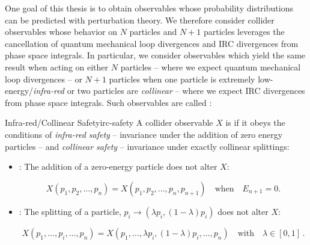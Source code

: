 One goal of this thesis is to obtain observables whose probability distributions can be predicted with perturbation theory.
%
We therefore consider collider observables whose behavior on \(N\) particles and \(N+1\) particles leverages the cancellation of quantum mechanical loop divergences and IRC divergences from phase space integrals.
%
In particular, we consider observables which yield the same result when acting on either \(N\) particles -- where we expect quantum mechanical loop divergences -- or \(N+1\) particles when one particle is extremely low-energy/\emph{infra-red} or two particles are \emph{collinear} -- where we expect IRC divergences from phase space integrals.
%
Such observables are called :


\begin{definitionbox}{Infra-red/Collinear Safety}{irc-safety}
    A collider observable \( X \) is  if it obeys the conditions of \emph{infra-red safety} -- invariance under the addition of zero energy particles -- and \emph{collinear safety} -- invariance under exactly collinear splittings:
    \begin{itemize}
        \item
            :
            The addition of a zero-energy particle does not alter \( X \):

        \begin{equation}
            X(p_1, p_2, \dots, p_n)
            =
            X(p_1, p_2, \dots, p_n, p_{n+1})
            \quad
            \text{when}
            \quad E_{n+1} = 0.
        \end{equation}


        \item
            :
            The  splitting of a particle, \(p_i \to (\lambda p_i, (1-\lambda) p_i)\) does not alter \( X \):

            \begin{equation}
                X(p_1, \dots, p_i, \dots, p_n)
                =
                X(p_1, \dots, \lambda p_i, (1-\lambda) p_i, \dots, p_n)
                \quad
                \text{with}
                \quad
                \lambda \in [0, 1]
                \,.
            \end{equation}
    \end{itemize}
\end{definitionbox}

